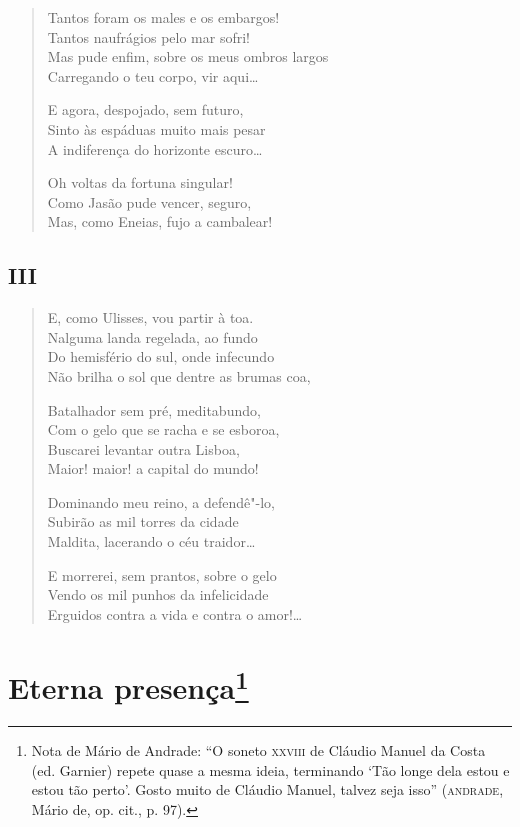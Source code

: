 {\begin{verse}
Tantos foram os males e os embargos!\\
Tantos naufrágios pelo mar sofri!\\
Mas pude enfim, sobre os meus ombros largos\\
Carregando o teu corpo, vir aqui\ldots{}

E agora, despojado, sem futuro,\\
Sinto às espáduas muito mais pesar\\
A indiferença do horizonte escuro\ldots{}

Oh voltas da fortuna singular!\\
Como Jasão pude vencer, seguro,\\
Mas, como Eneias, fujo a cambalear!
\end{verse}

\medskip
\section*{III}

\begin{verse}
E, como Ulisses, vou partir à toa.\\
Nalguma landa regelada, ao fundo\\
Do hemisfério do sul, onde infecundo\\
Não brilha o sol que dentre as brumas coa,

Batalhador sem pré, meditabundo,\\
Com o gelo que se racha e se esboroa,\\
Buscarei levantar outra Lisboa,\\
Maior! maior! a capital do mundo!

Dominando meu reino, a defendê"-lo,\\
Subirão as mil torres da cidade\\
Maldita, lacerando o céu traidor\ldots{}

E morrerei, sem prantos, sobre o gelo\\
Vendo os mil punhos da infelicidade\\
Erguidos contra a vida e contra o amor!\ldots{}
\end{verse}

\chapter[Eterna presença\medskip]{Eterna presença\footnote[*]{Nota de Mário de Andrade: ``O soneto
  \textsc{xxviii} de Cláudio Manuel da Costa (ed. Garnier) repete quase a mesma
  ideia, terminando `Tão longe dela estou e estou tão perto'. Gosto
  muito de Cláudio Manuel, talvez seja isso'' (\textsc{andrade}, Mário de, op.
  cit., p. 97).}}

}

